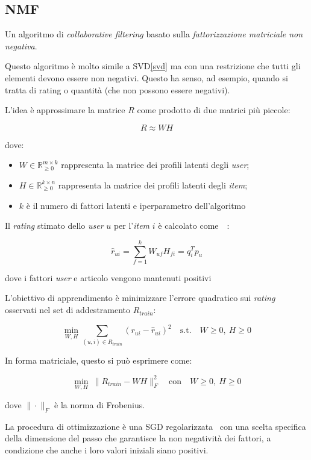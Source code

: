 \subsection{NMF}\label{nmf}

Un algoritmo di \textit{collaborative filtering} basato sulla \textit{fattorizzazione matriciale non negativa}.  

Questo algoritmo è molto simile a SVD\ref{svd} ma con una restrizione che tutti gli elementi devono essere non negativi. Questo ha senso, ad esempio, quando si tratta di rating o quantità (che non possono essere negativi).

L'idea è approssimare la matrice $R$ come prodotto di due matrici più piccole:

\[
R \approx WH
\]

dove:
\begin{itemize}
    \item $W \in \mathbb{R}_{\geq 0}^{m \times k}$ rappresenta la matrice dei profili latenti degli \textit{user};
    \item $H \in \mathbb{R}_{\geq 0}^{k \times n}$ rappresenta la matrice dei profili latenti degli \textit{item};
    \item $k$ è il numero di fattori latenti e iperparametro dell'algoritmo
\end{itemize}

Il \textit{rating} stimato dello \textit{user} $u$ per l'\textit{item} $i$ è calcolato come~\cite{NMF2}~\cite{NMF3}:

\[
\hat{r}_{ui} = \sum_{f=1}^k W_{uf} H_{fi} = q_i^T p_u
\]

dove i fattori \textit{user} e articolo vengono mantenuti positivi

L'obiettivo di apprendimento è minimizzare l'errore quadratico sui \textit{rating} osservati nel set di addestramento $R_{train}$:

\[
\min_{W, H} \sum_{(u,i) \in R_{train}} \left( r_{ui} - \hat{r}_{ui} \right)^2 \quad \text{s.t.} \quad W \geq 0,\ H \geq 0
\]

In forma matriciale, questo si può esprimere come:

\[
\min_{W, H} \ \| R_{train} - WH \|_F^2 \quad \text{con} \quad W \geq 0,\ H \geq 0
\]

dove $\| \cdot \|_F$ è la norma di Frobenius.

La procedura di ottimizzazione è una SGD regolarizzata~\cite{NMF} con una scelta specifica della dimensione del passo che garantisce la non negatività dei fattori, a condizione che anche i loro valori iniziali siano positivi.

